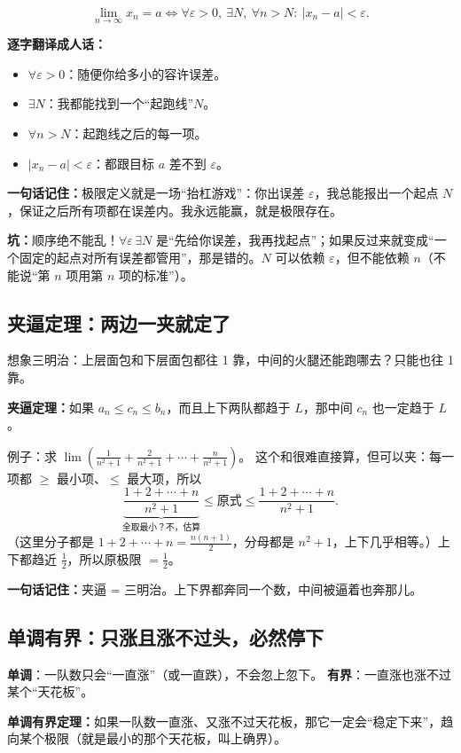 ﻿\documentclass[11pt,a4paper,UTF8]{ctexart}
\newcommand{\eps}{\varepsilon}
\newcommand{\idea}[1]{\par\smallskip\noindent\colorbox{yellow!22}{\textbf{一句话记住：}#1}\par\smallskip}
\newcommand{\warn}[1]{\par\smallskip\noindent\textcolor{red!70!black}{\textbf{坑：}#1}\par\smallskip}
\begin{document}
$$\lim_{n\to\infty}x_n=a\iff\forall\eps>0,\ \exists N,\ \forall n>N:\ |x_n-a|<\eps.$$

\textbf{逐字翻译成人话：}
\begin{itemize}[leftmargin=1.4em]
\item $\forall\eps>0$：随便你给多小的容许误差。
\item $\exists N$：我都能找到一个“起跑线”$N$。
\item $\forall n>N$：起跑线之后的每一项。
\item $|x_n-a|<\eps$：都跟目标 $a$ 差不到 $\eps$。
\end{itemize}

\idea{极限定义就是一场“抬杠游戏”：你出误差 $\eps$，我总能报出一个起点 $N$，保证之后所有项都在误差内。我永远能赢，就是极限存在。}

\warn{顺序绝不能乱！$\forall\eps\,\exists N$ 是“先给你误差，我再找起点”；如果反过来就变成“一个固定的起点对所有误差都管用”，那是错的。$N$ 可以依赖 $\eps$，但不能依赖 $n$（不能说“第 $n$ 项用第 $n$ 项的标准”）。}

\subsection{夹逼定理：两边一夹就定了}

想象三明治：上层面包和下层面包都往 1 靠，中间的火腿还能跑哪去？只能也往 1 靠。

\textbf{夹逼定理：}如果 $a_n\le c_n\le b_n$，而且上下两队都趋于 $L$，那中间 $c_n$ 也一定趋于 $L$。

例子：求 $\lim\left(\frac1{n^2+1}+\frac2{n^2+1}+\cdots+\frac{n}{n^2+1}\right)$。
这个和很难直接算，但可以夹：每一项都 $\ge$ 最小项、$\le$ 最大项，所以
$$\underbrace{\frac{1+2+\cdots+n}{n^2+1}}_{\text{全取最小？不，估算}} \le \text{原式}\le \frac{1+2+\cdots+n}{n^2+1}.$$
（这里分子都是 $1+2+\cdots+n=\frac{n(n+1)}2$，分母都是 $n^2+1$，上下几乎相等。）上下都趋近 $\frac12$，所以原极限 $=\frac12$。

\idea{夹逼 = 三明治。上下界都奔同一个数，中间被逼着也奔那儿。}

\subsection{单调有界：只涨且涨不过头，必然停下}

\textbf{单调}：一队数只会“一直涨”（或一直跌），不会忽上忽下。
\textbf{有界}：一直涨也涨不过某个“天花板”。

\textbf{单调有界定理：}如果一队数一直涨、又涨不过天花板，那它一定会“稳定下来”，趋向某个极限（就是最小的那个天花板，叫上确界）。
\end{document}
